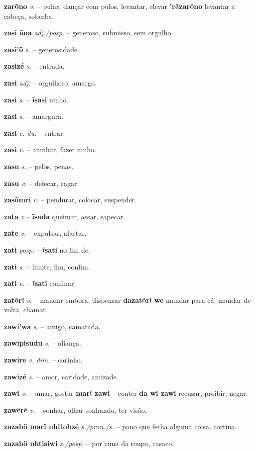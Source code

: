 \textbf{zarõno} \textit{v.} -- pular, dançar com pulos, levantar, elevar  \textbf{'rãzarõno} levantar a cabeça, soberba.

\textbf{zasi ãna} \textit{adj./posp.} -- generoso, submisso, sem orgulho.

\textbf{zasi'õ} \textit{s.} -- generosidade.

\textbf{zasizé} \textit{s.} -- entrada.

\textbf{zasi} \textit{adj.} -- orgulhoso, amargo.

\textbf{zasi} \textit{s.} -- \textbf{ĩsasi} ninho.

\textbf{zasi} \textit{s.} -- amargura.

\textbf{zasi} \textit{v. du.} -- entrar.

\textbf{zasi} \textit{v.} -- aninhar, fazer ninho.

\textbf{zasu} \textit{s.} -- pelos, penas.

\textbf{zasu} \textit{v.} -- defecar, cagar.

\textbf{zasõmri} \textit{v.} -- pendurar, colocar, suspender.

\textbf{zata} \textit{v} -- \textbf{ĩsada} queimar, assar, sapecar.

\textbf{zate} \textit{v.} -- expulsar, afastar.

\textbf{zati} \textit{posp.} -- \textbf{ĩsati} no fim de.

\textbf{zati} \textit{s.} -- limite, fim, confim.

\textbf{zati} \textit{v.} -- \textbf{ĩsati} confinar.

\textbf{zatõrĩ} \textit{v.} -- mandar embora, dispensar  \textbf{dazatõrĩ we} mandar para cá, mandar de volta, chamar.

\textbf{zawi'wa} \textit{s.} -- amigo, camarada.

\textbf{zawipisudu} \textit{s.} -- aliança.

\textbf{zawire} \textit{v. dim.} -- carinho.

\textbf{zawizé} \textit{s.} -- amor, caridade, amizade.

\textbf{zawi} \textit{v.} -- amar, gostar  \textbf{marĩ zawi} -- conter  \textbf{da wi zawi} recusar, proibir, negar.

\textbf{zawẽrẽ} \textit{v.} -- sonhar, olhar sonhando, ter visão.

\textbf{zazahö marĩ nhitobzé} \textit{s./pron./s.} -- pano que fecha alguma coisa, cortina.

\textbf{zazahö nhtisiwi} \textit{s./posp.} -- por cima da roupa, casaco.

